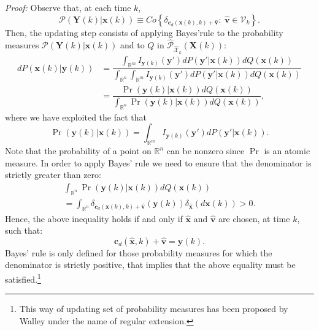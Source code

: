 \documentclass[twocolumn]{autart}
\newenvironment*{proof}{\emph{Proof:}}{}
\newcommand{\DP}[1]{{#1}}
\begin{document}
\begin{proof}
Observe that, at each time $k$,
$$
\mathcal{P}(\mathbf{Y}(k)|\mathbf{x}(k))\equiv Co\left\{\delta_{\mathbf{c}_d(\mathbf{x}(k),k)+\mathbf{\hat{v}}}:~\mathbf{\hat{v}}\in \mathcal{V}_k\right\}.
$$
Then, the updating step consists of applying Bayes'rule to the probability measures  $\mathcal{P}(\mathbf{Y}(k)|\mathbf{x}(k))$  and to
$Q$    in $\mathcal{\hat{P}}_{\hat{\mathcal{X}}_{k}}(\mathbf{X}(k))$:
\begin{align}
\nonumber
dP(\mathbf{x}(k)|\mathbf{y}(k))&=\dfrac{\int_{\mathbb{R}^m} I_{\mathbf{y}(k)}(\mathbf{y}')dP(\mathbf{y}'|\mathbf{x}(k))dQ(\mathbf{x}(k)) }{\int_{\mathbb{R}^n} \int_{\mathbb{R}^m} I_{\mathbf{y}(k)}(\mathbf{y}')dP(\mathbf{y}'|\mathbf{x}(k))dQ(\mathbf{x}(k)) }\\
\nonumber
&=\dfrac{\Pr(\mathbf{y}(k)|\mathbf{x}(k))dQ(\mathbf{x}(k)) }{\int_{\mathbb{R}^n} \Pr(\mathbf{y}(k)|\mathbf{x}(k)) dQ(\mathbf{x}(k)) },
\end{align}
where we have exploited the fact that
$$
\Pr(\mathbf{y}(k)|\mathbf{x}(k))=\int_{\mathbb{R}^m} I_{\mathbf{y}(k)}(\mathbf{y}')dP(\mathbf{y}'|\mathbf{x}(k)).
$$
Note that the probability of a point on $\mathbb{R}^n$ can be nonzero since $\Pr$ is an atomic measure.
In order to apply Bayes' rule we need to ensure that the denominator is strictly greater than zero:
$$
\begin{array}{l}
\int_{\mathbb{R}^n} \Pr(\mathbf{y}(k)|\mathbf{x}(k))dQ(\mathbf{x}(k))\\
=\int_{\mathbb{R}^n} \delta_{\mathbf{c}_d(\mathbf{x}(k),k)+\mathbf{\hat{v}}}(\mathbf{y}(k))\delta_{\hat{\mathbf{x}}}(d\mathbf{x}(k))>0.
\end{array}
$$
Hence, the above inequality holds if and only if $\hat{\mathbf{x}}$ and $\mathbf{\hat{v}}$ are chosen, \DP{at time $k$,}  such that:
\begin{equation}
\label{eq:consdenom}
\mathbf{c}_d(\hat{\mathbf{x}},k)+\mathbf{\hat{v}}=\mathbf{y}(k).
\end{equation}
Bayes' rule is only defined for those probability measures for which
the denominator is strictly positive, that implies that the above equality must be satisfied.\footnote{This way of updating set of probability measures has been proposed by Walley  \cite[Appendix J]{walley1991} under
the name of regular extension.}

\end{proof}
\end{document}
